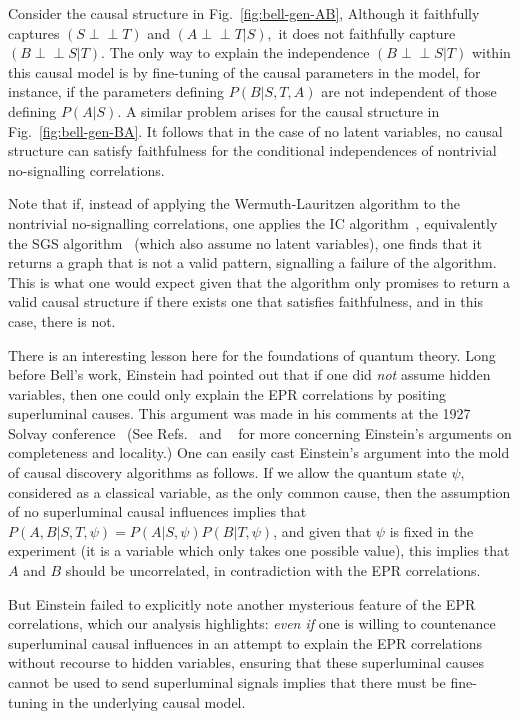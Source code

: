 \documentclass[letterpaper,onecolumn,nofootinbib]{revtex4}
\def\indep{\perp\!\!\!\!\perp}
\begin{document}
Consider the causal structure in Fig.~\ref{fig:bell-gen-AB}, Although it faithfully
captures $\left( S\indep T\right) $ and $\left( A\indep T|S\right) ,$ it does
not faithfully capture $\left( B\indep S|T\right) .$ The only way to
explain the independence $\left( B\indep S|T\right) $ within this causal
model is by fine-tuning of the causal parameters in the model, for instance,
if the parameters defining $P(B|S,T,A)$ are not independent of those
defining $P(A|S)$. A similar problem arises for the causal structure in
Fig.~\ref{fig:bell-gen-BA}. It follows that in the case of no latent variables, no
causal structure can satisfy faithfulness for the conditional independences of nontrivial
no-signalling correlations.

Note that if, instead of applying the Wermuth-Lauritzen algorithm to the nontrivial no-signalling correlations, one applies the IC algorithm~\cite{Pearl2009}, equivalently the SGS algorithm~\cite{Spirtes2001} (which also assume no latent variables), one finds that it returns a graph that is not a valid pattern, signalling a failure of the algorithm.  This is what one would expect given that the algorithm only promises to return a valid causal structure if there exists one that satisfies faithfulness, and in this case, there is not.

There is an interesting lesson here for the foundations of quantum theory.
Long before Bell's work, Einstein had pointed
out that if one did \emph{not} assume hidden variables, then one could only
explain the EPR correlations by positing superluminal causes. This
argument was made in his comments at the 1927 Solvay conference~\cite{Bacci2009} (See Refs.~\cite{Norsen2010} and ~\cite{Harrigan2010} for more concerning Einstein's
arguments on completeness and locality.) One can easily cast Einstein's
argument into the mold of causal discovery algorithms as follows. If we allow the quantum state $\psi$, considered as a classical variable, as the only common cause, then the assumption of no superluminal
causal influences implies that $P(A,B|S,T,\psi )=P(A|S,\psi )P(B|T,\psi )$, and given that $
\psi $ is fixed in the experiment (it is a variable which only takes one
possible value), this implies that $A$ and $B$ should be uncorrelated, in
contradiction with the EPR correlations.

But Einstein failed to explicitly note another mysterious feature of the EPR correlations, which our analysis highlights:
\emph{even if} one is willing to countenance superluminal causal influences in an
attempt to explain the EPR correlations without recourse to hidden variables,
ensuring that these superluminal causes cannot be used to send
superluminal signals implies that there must be fine-tuning in the
underlying causal model.
\end{document}
